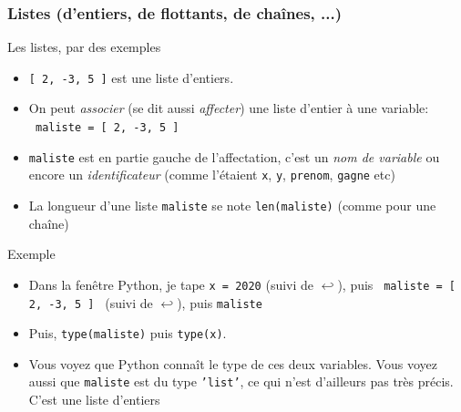 \documentclass{beamer}
\newcommand{\mypause}{~}
\newcommand{\alalign}{{$\hookleftarrow$}}
\newcommand{\pyth}{{\sc Python}}
\newcommand{\prog}[1]{\alert{\texttt{#1}}}
\begin{document}
\frame
{
\frametitle{Listes (d'entiers, de flottants, de chaînes, ...)}
{\footnotesize
\begin{block}{Les listes, par des exemples}\mypause{}
\begin{itemize}
\item \prog{[ 2, -3, 5 ]} est une \alert{liste d'entiers}. \mypause{}
\item On peut \alert{\em associer} (se dit aussi \alert{\em affecter}) une liste d'entier à
une variable:\\ \prog{ maliste = [ 2, -3, 5 ] }\mypause{}
\item \prog{maliste} est en \alert{partie gauche} de l'affectation, c'est un {\em nom de variable} ou
encore un {\em identificateur} (comme l'étaient \prog{x}, \prog{y}, \prog{prenom}, \prog{gagne} etc)\mypause{}
\item La longueur d'une liste \prog{maliste} se note \prog{len(maliste)} (comme pour une chaîne)\mypause{}
\end{itemize}
\end{block}

\begin{block}{Exemple}
\begin{itemize}
\item Dans la fenêtre \pyth{}, je tape \prog{x = 2020} (suivi de \alalign{}), puis \prog{ maliste = [ 2, -3, 5 ] } (suivi de \alalign{}), puis
\prog{maliste}\mypause{}
\item Puis, \prog{type(maliste)} puis \prog{type(x)}. \mypause{}
\item Vous voyez que
\pyth{} connaît le type de ces deux variables. Vous voyez aussi que
\prog{maliste} est du type \prog{'list'}, ce qui n'est d'ailleurs pas très précis. C'est
une liste d'entiers
\end{itemize}
\end{block}
}
}
\end{document}
